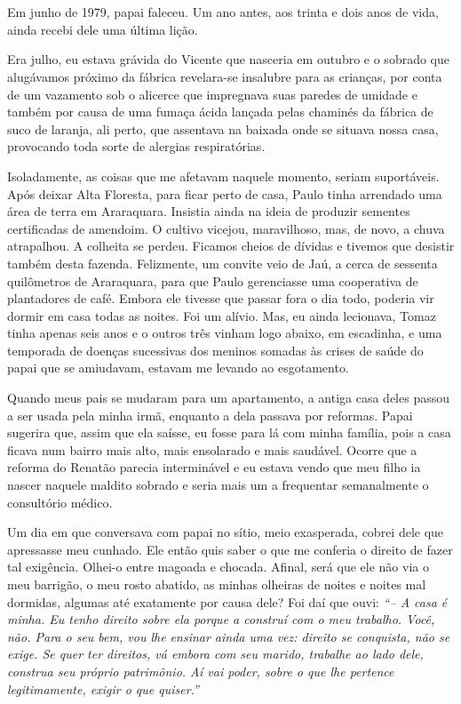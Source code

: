 \chapter{}
Em junho de 1979, papai faleceu.
Um ano antes, aos trinta e dois anos de vida, ainda recebi dele uma última lição.
 
Era julho, eu estava grávida do Vicente que nasceria em outubro e o sobrado que alugávamos próximo da fábrica revelara-se insalubre para as crianças, por conta de um vazamento sob o alicerce que impregnava suas paredes de umidade e também por causa de uma fumaça ácida lançada pelas chaminés da fábrica de suco de laranja, ali perto, que assentava na baixada onde se situava nossa casa, provocando toda sorte de alergias respiratórias.

Isoladamente, as coisas que me afetavam naquele momento, seriam suportáveis.
Após deixar Alta Floresta, para ficar perto de casa, Paulo tinha arrendado uma área de terra em Araraquara.
Insistia ainda na ideia de produzir sementes certificadas de amendoim.
O cultivo vicejou, maravilhoso, mas, de novo, a chuva atrapalhou.
A colheita se perdeu.
Ficamos cheios de dívidas e tivemos que desistir também desta fazenda.
Felizmente, um convite veio de Jaú, a cerca de sessenta quilômetros de Araraquara, para que Paulo gerenciasse uma cooperativa de plantadores de café.
Embora ele tivesse que passar fora o dia todo, poderia vir dormir em casa todas as noites.
Foi um alívio.
Mas, eu ainda lecionava, Tomaz tinha apenas seis anos e o outros três vinham logo abaixo, em escadinha, e uma temporada de doenças sucessivas dos meninos somadas às crises de saúde do papai que se amiudavam, estavam me levando ao esgotamento.
 
Quando meus pais se mudaram para um apartamento, a antiga casa deles passou a ser usada pela minha irmã, enquanto a dela passava por reformas.
Papai sugerira que, assim que ela saísse, eu fosse para lá com minha família, pois a casa ficava num bairro mais alto, mais ensolarado e mais saudável.
Ocorre que a reforma do Renatão parecia interminável e eu estava vendo que meu filho ia nascer naquele maldito sobrado e seria mais um a frequentar semanalmente o consultório médico.

Um dia em que conversava com papai no sítio, meio exasperada, cobrei dele que apressasse meu cunhado.
Ele então quis saber o que me conferia o direito de fazer tal exigência.
Olhei-o entre magoada e chocada.
Afinal, será que ele não via o meu barrigão, o meu rosto abatido, as minhas olheiras de noites e noites mal dormidas, algumas até exatamente por causa dele? Foi daí que ouvi:
\textit{``-- A casa é minha.
Eu tenho direito sobre ela porque a construí com o meu trabalho.
Você, não.
Para o seu bem, vou lhe ensinar ainda uma vez: direito se conquista, não se exige.
Se quer ter direitos, vá embora com seu marido, trabalhe ao lado dele, construa seu próprio patrimônio.
Aí vai poder, sobre o que lhe pertence legitimamente, exigir o que quiser.''}

